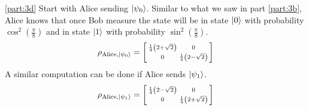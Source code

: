 \documentclass[boxes,pages]{homework}
\begin{document}
\begin{solution}
	\ref{part:3d}
	Start with Alice sending $\ket{\psi_0}$. Similar to what we saw in part \ref{part:3b}, Alice knows that once Bob measure the state will be in state $\ket{0}$ with probability $\cos^2(\tfrac{\pi}{8})$ and in state $\ket{1}$ with probability $\sin^2(\tfrac{\pi}{8})$.
	\begin{equation*}
		\rho_{\text{Alice},\ket{\psi_0}} = \smqty[\frac{1}{4}\qty(2 + \sqrt{2}) & 0 \\ 0 & \frac{1}{4}\qty(2 - \sqrt{2})]
	\end{equation*}
	A similar computation can be done if Alice sends $\ket{\psi_1}$.
	\begin{equation*}
		\rho_{\text{Alice},\ket{\psi_1}} = \smqty[\frac{1}{4}\qty(2 - \sqrt{2}) & 0 \\ 0 & \frac{1}{4}\qty(2 + \sqrt{2})]
	\end{equation*}
\end{solution}
\end{document}
